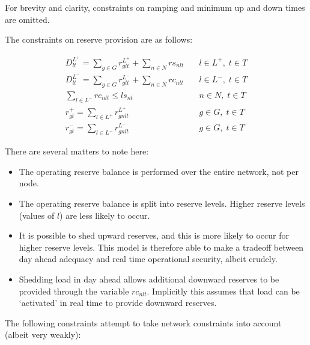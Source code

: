\documentclass[number,times]{elsarticle}
\begin{document}
For brevity and clarity, constraints on ramping and minimum up and down times are omitted.

The constraints on reserve provision are as follows:

\begin{align}
    D^{L^+}_{lt} = \sum_{g \in G} r^{L^+}_{glt} + \sum_{n \in N} rs_{nlt} & \quad l \in L^+, \; t \in T \\
    D^{L^-}_{lt} = \sum_{g \in G} r^{L^-}_{glt} + \sum_{n \in N} rc_{nlt} & \quad l \in L^-, \; t \in T \\
    \sum_{l \in L^-} rc_{nlt} \leq ls_{nt}                                & \quad n \in N, \; t \in T   \\
    r^{+}_{gt} = \sum_{l \in L^+} r^{L^+}_{gnlt}                          & \quad g \in G, \; t \in T   \\
    r^{-}_{gt} = \sum_{l \in L^-} r^{L^-}_{gnlt}                          & \quad g \in G, \; t \in T
\end{align}

There are several matters to note here:

\begin{itemize}
    \item The operating reserve balance is performed over the entire network, not per node.
    \item The operating reserve balance is split into reserve levels. Higher reserve levels (values of $l$) are less likely to occur.
    \item It is possible to shed upward reserves, and this is more likely to occur for higher reserve levels. This model is therefore able to make a tradeoff between day ahead adequacy and real time operational security, albeit crudely.
    \item Shedding load in day ahead allows additional downward reserves to be provided through the variable $rc_{nlt}$. Implicitly this assumes that load can be `activated' in real time to provide downward reserves.
\end{itemize}

The following constraints attempt to take network constraints into account (albeit very weakly):
\end{document}
